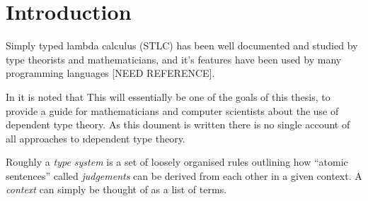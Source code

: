 \section{Introduction}

Simply typed lambda calculus (STLC) has been well documented and studied by type theorists and mathematicians, and it's features have been used by many programming languages [NEED REFERENCE].

In \cite{BarendregtHenk2013Lcwt} it is noted that  This will essentially be one of the goals of this thesis, to provide a guide for mathematicians and computer scientists about the use of dependent type theory. As this doument is written there is no single account of all approaches to \i{dependent} type theory.


Roughly a \textit{type system} is a set of loosely organised rules outlining how ``atomic sentences'' called \textit{judgements} can be derived from each other in a given context. A \textit{context} can simply be thought of as a list of terms. 

